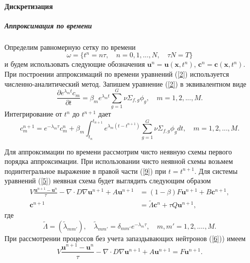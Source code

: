 \documentclass{crm-article}
\begin{document}
\paragraph{Дискретизация}
\subparagraph{Аппроксимация по времени}
Определим равномерную сетку по времени
\[
\omega = \{ t^n=n \tau, \quad n = 0,1,...,N, \quad \tau N = T \}
\]
и будем использовать следующие обозначения $\bm{u}^n = \bm{u}(\bm{x}, t^n)$, $\bm c^n = \bm c(\bm{x}, t^n)$. 
При построении аппроксимаций по времени уравнений (\ref{2}) используется численно-аналитический метод.
Запишем уравнение (\ref{2}) в эквивалентном виде
\[
  \frac{\partial e^{\lambda_m t}  c_m}{\partial t} = \beta_m  e^{\lambda_m t} \sum_{g=1}^{G} \nu \Sigma_{f,g} \phi_g,
 \quad m = 1,2, ..., M .
\] 
Интегрирование от $t^{n}$ до $t^{n+1}$ дает
\begin{equation}\label{9}
c_m^{n+1} = e^{-\lambda_m\tau} c_m^n + \beta_m \int_{t_n}^{t_{n+1}}e^{\lambda_m (t-t^{n+1})} \sum_{g=1}^{G} \nu \Sigma_{f,g} \phi_g d t,
 \quad m = 1,2, ..., M.
\end{equation}

Для аппроксимации по времени рассмотрим чисто неявную схемы первого порядка аппроксимации. 
При использовании чисто неявной схемы возьмем подинтегральное выражение в правой части (\ref{9}) при $t = t^{n+1}$. 
Для системы уравнений (\ref{5}) неявная схема будет выглядить следующим образом
\begin{equation}\label{10}
\begin{split}
V \frac{\bm{u}^{n+1} - \bm{u}^n}{\tau} - \nabla\cdot D \nabla\bm{u}^{n+1}  + A\bm{u}^{n+1} &=(1-\beta) F \bm{u}^{n+1} + B\bm c^{n+1},
\\
\bm{c}^{n+1} & = \widetilde{\Lambda}\bm{c}^{n} + \tau Q \bm{u}^{n+1},
\end{split}
\end{equation}
где
\[
\widetilde{\Lambda} = (\widetilde{\lambda}_{mm'}), \quad \widetilde{\lambda}_{mm'} = \delta_{mm'} e^{-\lambda_m\tau},
 \quad m, m' = 1,2, ....,M .
\]
При рассмотрении процессов без учета запаздывающих нейтронов (\ref{6})) имеем
\begin{equation}\label{11}
V \frac{\bm{u}^{n+1} - \bm{u}^n}{\tau} -\nabla \cdot D \nabla \bm{u}^{n+1} + A \bm{u}^{n+1} = F \bm{u}^{n+1}.
\end{equation}
\end{document}

